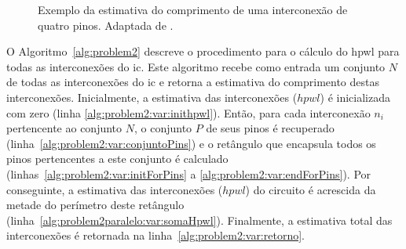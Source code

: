 \begin{figure}[ht]
    \centering
    \hspace{1cm}
    \caption[Exemplo do cálculo de HPWL.]{Exemplo da estimativa do comprimento de uma interconexão de quatro pinos. Adaptada de .}
    \label{fig:problem2}
\end{figure}

O Algoritmo~\ref{alg:problem2} descreve o procedimento para o cálculo do \ac{hpwl} para todas as interconexões do \ac{ic}. 
Este algoritmo recebe como entrada um conjunto $N$ de todas as interconexões do \ac{ic} e retorna a estimativa do comprimento destas interconexões.
Inicialmente, a estimativa das interconexões ($hpwl$) é inicializada com zero (linha \ref{alg:problem2:var:inithpwl}).
Então, para cada interconexão $n_i$ pertencente ao conjunto $N$, o conjunto $P$ de seus pinos é recuperado (linha~\ref{alg:problem2:var:conjuntoPins}) e o retângulo que encapsula todos os pinos pertencentes a este conjunto é calculado (linhas~\ref{alg:problem2:var:initForPins} a \ref{alg:problem2:var:endForPins}).
Por conseguinte, a estimativa das interconexões ($hpwl$) do circuito é acrescida da metade do perímetro deste retângulo (linha~\ref{alg:problem2paralelo:var:somaHpwl}).
Finalmente, a estimativa total das interconexões é retornada na linha~\ref{alg:problem2:var:retorno}.


